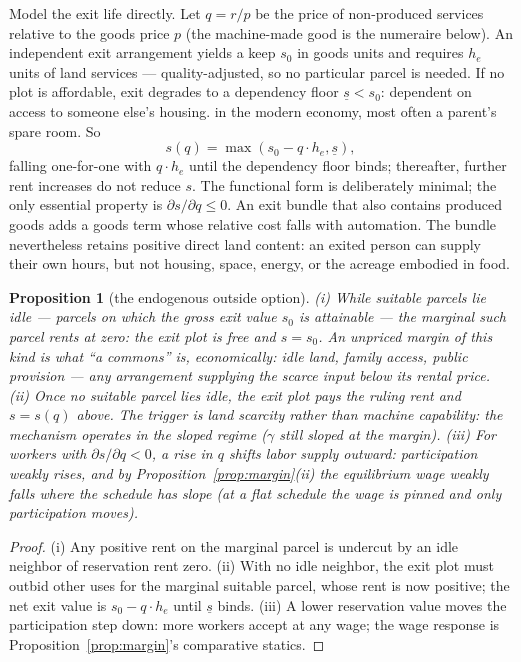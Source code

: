 \documentclass[12pt]{article}
\theoremstyle{plain}
\newtheorem{proposition}{Proposition}
\begin{document}
Model the exit life directly. Let $q = r/p$ be the price of non-produced services relative to the goods price $p$ (the machine-made good is the numeraire below). An independent exit arrangement yields a keep $s_0$ in goods units and requires $h_e$ units of land services --- quality-adjusted, so no particular parcel is needed. If no plot is affordable, exit degrades to a dependency floor $\underline{s} < s_0$: dependent on access to someone else's housing. in the modern economy, most often a parent's spare room. So
\begin{equation}\label{eq:exit}
s(q) = \max( s_0 - q\cdot h_e , \underline{s} ),
\end{equation}
falling one-for-one with $q\cdot h_e$ until the dependency floor binds; thereafter, further rent increases do not reduce $s$. The functional form is deliberately minimal; the only essential property is $\partial s/\partial q \le 0$. An exit bundle that also contains produced goods adds a goods term whose relative cost falls with automation. The bundle nevertheless retains positive direct land content: an exited person can supply their own hours, but not housing, space, energy, or the acreage embodied in food.

\begin{proposition}[the endogenous outside option]\label{prop:exit}
(i) While suitable parcels lie idle --- parcels on which the gross exit value $s_0$ is attainable --- the marginal such parcel rents at zero: the exit plot is free and $s = s_0$. An unpriced margin of this kind is what ``a commons'' is, economically: idle land, family access, public provision --- any arrangement supplying the scarce input below its rental price. (ii) Once no suitable parcel lies idle, the exit plot pays the ruling rent and $s = s(q)$ above. The trigger is land scarcity rather than machine capability: the mechanism operates in the sloped regime ($\gamma$ still sloped at the margin). (iii) For workers with $\partial s/\partial q < 0$, a rise in $q$ shifts labor supply outward: participation weakly rises, and by Proposition~\ref{prop:margin}(ii) the equilibrium wage weakly falls where the schedule has slope (at a flat schedule the wage is pinned and only participation moves).
\end{proposition}

\begin{proof}
(i) Any positive rent on the marginal parcel is undercut by an idle neighbor of reservation rent zero. (ii) With no idle neighbor, the exit plot must outbid other uses for the marginal suitable parcel, whose rent is now positive; the net exit value is $s_0 - q\cdot h_e$ until $\underline{s}$ binds. (iii) A lower reservation value moves the participation step down: more workers accept at any wage; the wage response is Proposition~\ref{prop:margin}'s comparative statics.
\end{proof}
\end{document}
